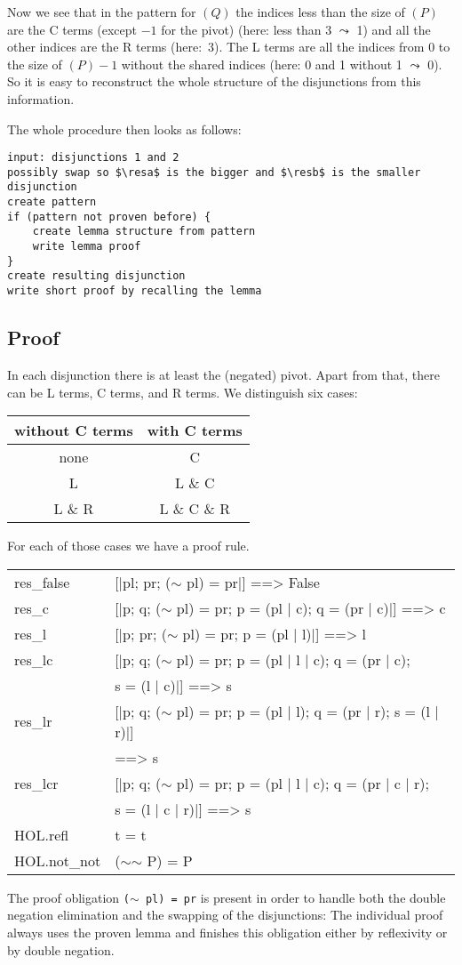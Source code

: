 \documentclass[10pt,a4paper]{article}
\newcommand{\resa}{\ensuremath{(P)}\xspace}
\newcommand{\resb}{\ensuremath{(Q)}\xspace}
\newcommand{\ttt}{\texttt}
\newcommand{\negat}{\ensuremath{\sim}}
\newcommand{\nega}{\negat\xspace}
\newenvironment{pt}[1]{\begin{center}\begin{tt}\begin{tabular}{#1}\hline}{\end{tabular}\end{tt}\end{center}}
\newcommand{\pl}[1]{#1 \\[1mm]}
\newcommand{\pll}[1]{#1 \\\hline}
\def\ind{\quad}
\begin{document}
Now we see that in the pattern for \resb the indices less than the size of \resa are the C terms (except $-1$ for the pivot) (here: less than 3 $\leadsto$ 1) and all the other indices are the R terms (here:~3). The L terms are all the indices from $0$ to the size of $\resa - 1$ without the shared indices (here: 0 and 1 without 1 $\leadsto$ 0). So it is easy to reconstruct the whole structure of the disjunctions from this information.

The whole procedure then looks as follows:
%
\begin{lstlisting}[mathescape=true,keywordstyle=\bf,deletekeywords={short}]
input: disjunctions 1 and 2
possibly swap so $\resa$ is the bigger and $\resb$ is the smaller disjunction
create pattern
if (pattern not proven before) {
	create lemma structure from pattern
	write lemma proof
}
create resulting disjunction
write short proof by recalling the lemma
\end{lstlisting}
%
\subsection*{Proof}
In each disjunction there is at least the (negated) pivot. Apart from that, there can be L terms, C terms, and R terms. We distinguish six cases:
\begin{center}
	\begin{tabular}{c|c}
		without C terms & with C terms \\
		\hline
		none & C \\
		L & L \& C \\
		L \& R & L \& C \& R
	\end{tabular}
\end{center}

For each of those cases we have a proof rule.
%
\begin{pt}{ll}
	\pl{res\_false & [|pl; pr; (\nega pl) = pr|] ==> False}
	\pl{res\_c & [|p; q; (\nega pl) = pr; p = (pl | c); q = (pr | c)|] ==> c}
	\pl{res\_l & [|p; pr; (\nega pl) = pr; p = (pl | l)|] ==> l}
	\pl{res\_lc & [|p; q; (\nega pl) = pr; p = (pl | l | c); q = (pr | c);}
		\pl{& \ind s = (l | c)|] ==> s}
	\pl{res\_lr & [|p; q; (\nega pl) = pr; p = (pl | l); q = (pr | r); s = (l | r)|]}
		\pl{& \ind ==> s}
	\pl{res\_lcr & [|p; q; (\nega pl) = pr; p = (pl | l | c); q = (pr | c | r);}
		\pl{& \ind s = (l | c | r)|] ==> s}
	\pl{HOL.refl & t = t}
	\pll{HOL.not\_not & (\nega \nega P) = P}
\end{pt}

The proof obligation \ttt{(\nega pl) = pr} is present in order to handle both the double negation elimination and the swapping of the disjunctions: The individual proof always  uses the proven lemma and finishes this obligation either by reflexivity or by double negation.
\end{document}
